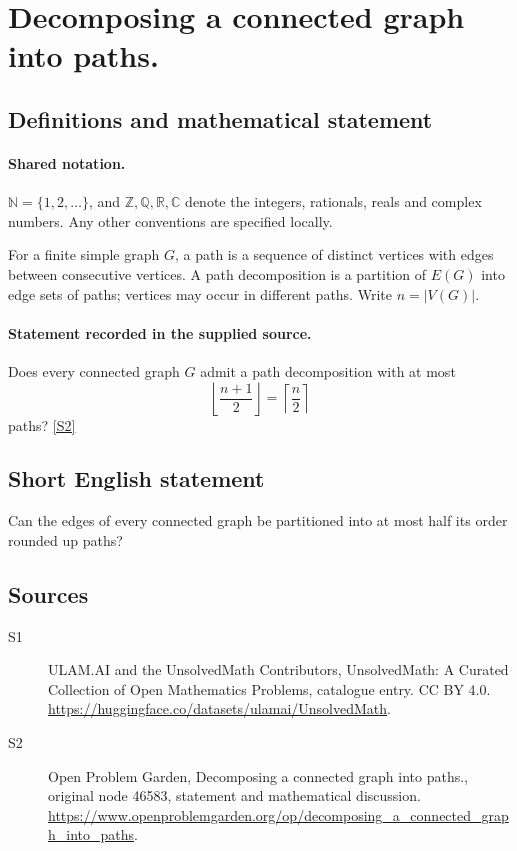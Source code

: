 \documentclass[11pt]{article}
\newcommand{\sref}[2]{\hyperlink{source:#1:#2}{[S#2]}}
\begin{document}
\section{Decomposing a connected graph into paths.}\label{statement}

\subsection{Definitions and mathematical statement}

\paragraph{Shared notation.}$\mathbb N=\{1,2,\ldots\}$, and $\mathbb Z,\mathbb Q,\mathbb R,\mathbb C$ denote the integers, rationals, reals and complex numbers. Any other conventions are specified locally.


For a finite simple graph $G$, a path is a sequence of distinct vertices with edges between consecutive vertices. A path decomposition is a partition of $E(G)$ into edge sets of paths; vertices may occur in different paths. Write $n=|V(G)|$.
\paragraph{Statement recorded in the supplied source.}
Does every connected graph $G$ admit a path decomposition with at most \[\left\lfloor\frac{n+1}{2}\right\rfloor=\left\lceil\frac n2\right\rceil\] paths? \sref{statement}{2}
\subsection{Short English statement}
Can the edges of every connected graph be partitioned into at most half its order rounded up paths?
\subsection{Sources}
\begin{description}
\item[\hypertarget{source:statement:1}{S1}] ULAM.AI and the UnsolvedMath Contributors, UnsolvedMath: A Curated Collection of Open Mathematics Problems, catalogue entry. CC BY 4.0. \url{https://huggingface.co/datasets/ulamai/UnsolvedMath}.
\item[\hypertarget{source:statement:2}{S2}] Open Problem Garden, Decomposing a connected graph into paths., original node 46583, statement and mathematical discussion. \url{https://www.openproblemgarden.org/op/decomposing_a_connected_graph_into_paths}.
\end{description}
\label{end:statement}
\end{document}
